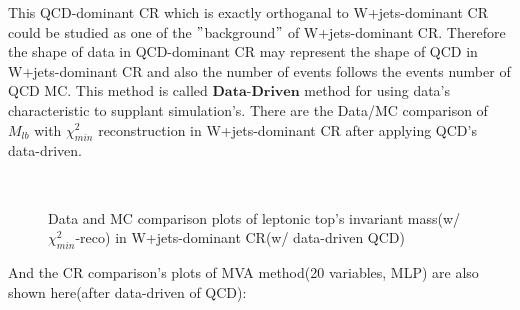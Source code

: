 		This QCD-dominant CR which is exactly orthoganal to W+jets-dominant CR could be studied as one of the $"$background$"$ of W+jets-dominant CR. Therefore the shape of data in QCD-dominant CR may represent the shape of QCD in W+jets-dominant CR and also the number of events follows the events number of QCD MC. This method is called $\textbf{Data-Driven}$ method for using data's characteristic to supplant simulation's. There are the Data/MC comparison of $M_{lb}$ with $\chi^2_{min}$ reconstruction in W+jets-dominant CR after applying QCD's data-driven.

		\begin{figure}[H]
		\centering
			\\
		\caption{Data and MC comparison plots of leptonic top's invariant mass(w/ $\chi^2_{min}$-reco) in W+jets-dominant CR(w/ data-driven QCD)}
		\label{EventSelReco:fig:chi2_CR1_1C_Mlb_DD}
		\end{figure}
		\FloatBarrier

		And the CR comparison's plots of MVA method(20 variables, MLP) are also shown here(after data-driven of QCD):

